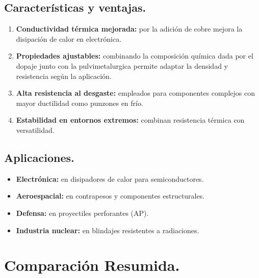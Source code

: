 \documentclass[12pt,a4paper]{article}
\begin{document}
\subsection{Características y ventajas.}

\begin{enumerate}
    \item \textbf{Conductividad térmica mejorada:} por la adición de cobre mejora la disipación de calor en electrónica.
    \item \textbf{Propiedades ajustables:} combinando la composición química dada por el dopaje junto con la pulvimetalurgica permite adaptar la densidad y resistencia según la aplicación.
    \item \textbf{Alta resistencia al desgaste:} empleados para componentes complejos con mayor ductilidad como punzones en frío.
    \item \textbf{Estabilidad en entornos extremos:} combinan resistencia térmica con versatilidad.
\end{enumerate}

\subsection{Aplicaciones.}

\begin{itemize}
    \item \textbf{Electrónica:} en disipadores de calor para semiconductores.
    \item \textbf{Aeroespacial:} en contrapesos y componentes estructurales.
    \item \textbf{Defensa:} en proyectiles perforantes (AP).
    \item \textbf{Industria nuclear:} en blindajes resistentes a radiaciones.
\end{itemize}

\section{Comparación Resumida.}
\end{document}
